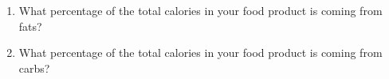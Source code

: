 \documentclass[main.tex]{subfiles}
\begin{document}
\begin{fullwidth}
\begin{center}
\begin{tabular}{ p{2.0cm}p{7.5cm}p{3cm}p{5cm}  }
\hline\end{tabular}\end{center}
\vspace{0.2cm}{\large \bfseries 6. PostLab questions }
\begin{enumerate}
\item What percentage of the total calories in your food product is coming from fats?
\vspace{2.cm}
\item What percentage of the total calories in your food product is coming from carbs?
\vspace{2.cm}
\end{enumerate}
\end{fullwidth}
\end{document}
